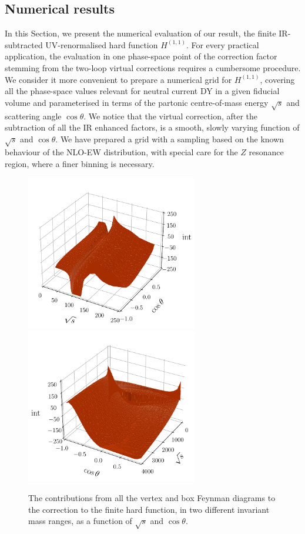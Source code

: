 \documentclass[11pt,a4paper]{article}
\begin{document}
\subsection{Numerical results}
\label{sec:numerics}
%
In this Section, we present the numerical evaluation of our result,
the finite IR-subtracted UV-renormalised hard function ${H}^{(1,1)}$.
For every practical application,
the evaluation in one phase-space point of the correction factor
stemming from the two-loop \oaas virtual corrections
requires a cumbersome procedure.
We consider it more convenient to prepare a numerical grid for
${H}^{(1,1)}$,
covering all the phase-space values relevant for
neutral current DY in a given fiducial volume and parameterised in terms of
the partonic centre-of-mass energy $\sqrt{s}$ and scattering angle $\cos\theta$.
We notice that the virtual correction,
after the subtraction of all the IR enhanced factors, is a smooth,
slowly varying function of  $\sqrt{s}$ and $\cos\theta$.
We have prepared a grid with a sampling based on the known behaviour
of the NLO-EW distribution,
with special care for the $Z$ resonance region,
where a finer binning is necessary.
\begin{figure}[t]
\begin{center}
\includegraphics[width=7.5cm]{plots/correction-VB-noFSR-250.pdf}
\includegraphics[width=7.5cm]{plots/correction-VB-noFSR-extended.pdf}
\end{center}
\vspace{-2ex}
\caption{\label{fig:correction}
 The contributions from all the vertex and box Feynman diagrams
 to the \oaas correction to the finite hard function,
  in two different invariant mass ranges,
  as a function of $\sqrt{s}$ and $\cos\theta$.
  }
\end{figure}
\end{document}

